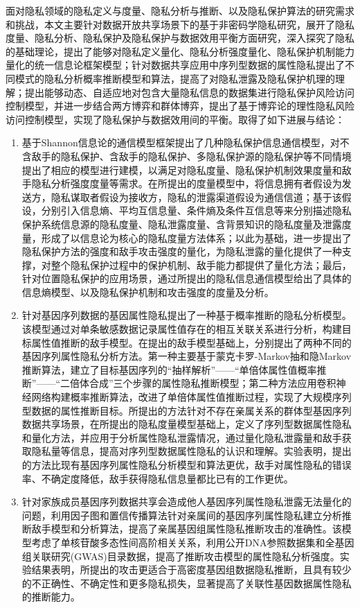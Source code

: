 面对隐私领域的隐私定义与度量、隐私分析与推断、以及隐私保护算法的研究需求和挑战，本文主要针对数据开放共享场景下的基于非密码学隐私研究，展开了隐私度量、隐私分析、隐私保护及隐私保护与数据效用平衡方面研究，深入探究了隐私的基础理论，提出了能够对隐私定义量化、隐私分析强度量化、隐私保护机制能力量化的统一信息论框架模型；针对数据共享应用中序列型数据的属性隐私提出了不同模式的隐私分析概率推断模型和算法，提高了对隐私泄露及隐私保护机理的理解；提出能够动态、自适应地对包含大量隐私信息的数据集进行隐私保护风险访问控制模型，并进一步结合两方博弈和群体博弈，提出了基于博弈论的理性隐私风险访问控制模型，实现了隐私保护与数据效用间的平衡。取得了如下进展与结论：
\begin{enumerate}
	\item 基于Shannon信息论的通信模型框架提出了几种隐私保护信息通信模型，对不含敌手的隐私保护、含敌手的隐私保护、多隐私保护源的隐私保护等不同情境提出了相应的模型进行建模，以满足对隐私度量、隐私保护机制效果度量和敌手隐私分析强度度量等需求。在所提出的度量模型中，将信息拥有者假设为发送方，隐私谋取者假设为接收方，隐私的泄露渠道假设为通信信道；基于该假设，分别引入信息熵、平均互信息量、条件熵及条件互信息等来分别描述隐私保护系统信息源的隐私度量、隐私泄露度量、含背景知识的隐私度量及泄露度量，形成了以信息论为核心的隐私度量方法体系；以此为基础，进一步提出了隐私保护方法的强度和敌手攻击强度的量化，为隐私泄露的量化提供了一种支撑，对整个隐私保护过程中的保护机制、敌手能力都提供了量化方法；最后，针对位置隐私保护的应用场景，通过所提出的隐私信息通信模型给出了具体的信息熵模型、以及隐私保护机制和攻击强度的度量及分析。
	\item 针对基因序列数据的基因属性隐私提出了一种基于概率推断的隐私分析模型。该模型通过对单条敏感数据记录属性值存在的相互关联关系进行分析，构建目标属性值推断的敌手模型。在提出的敌手模型基础上，分别提出了两种不同的基因序列属性隐私分析方法。第一种主要基于蒙克卡罗-Markov抽和隐Markov推断算法，建立了目标基因序列的“抽样解析”——“单倍体属性值概率推断”——“二倍体合成”三个步骤的属性隐私推断模型；第二种方法应用卷积神经网络构建概率推断算法，改进了单倍体属性值推断过程，实现了大规模序列型数据的属性推断目标。所提出的方法针对不存在亲属关系的群体型基因序列数据共享场景，在所提出的隐私度量模型基础上，定义了序列型数据属性隐私和量化方法，并应用于分析属性隐私泄露情况，通过量化隐私泄露量和敌手获取隐私量等信息，提高对序列型数据属性隐私的认识和理解。实验表明，提出的方法比现有基因序列属性隐私分析模型和算法更优，敌手对属性隐私的错误率、不确定度降低，敌手获得隐私信息量都比已有的工作更优。
	\item 针对家族成员基因序列数据共享会造成他人基因序列属性隐私泄露无法量化的问题，利用因子图和置信传播算法针对亲属间的基因序列属性隐私建立分析推断敌手模型和分析算法，提高了亲属基因组属性隐私推断攻击的准确性。该模型考虑了单核苷酸多态性间高阶相关关系，利用公开DNA参照数据集和全基因组关联研究(GWAS)目录数据，提高了推断攻击模型的属性隐私分析强度。实验结果表明，所提出的攻击更适合于高密度基因组数据隐私推断，且具有较少的不正确性、不确定性和更多隐私损失，显著提高了关联性基因数据属性隐私的推断能力。

\end{enumerate}

